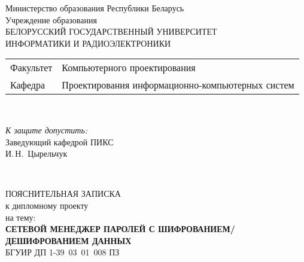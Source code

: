 \begin{titlepage}
  \begin{center}
    Министерство образования Республики Беларусь\\[1em]
    Учреждение образования\\
    БЕЛОРУССКИЙ ГОСУДАРСТВЕННЫЙ УНИВЕРСИТЕТ \\
    ИНФОРМАТИКИ И РАДИОЭЛЕКТРОНИКИ\\[1em]

    \begin{minipage}{\textwidth}
      \begin{flushleft}
        \begin{tabular}{ l l }
          Факультет & Компьютерного проектирования\\
          Кафедра   & Проектирования информационно-компьютерных систем
        \end{tabular}
      \end{flushleft}
    \end{minipage}\\[1em]

    \begin{flushright}
      \begin{minipage}{0.4\textwidth}
        \textit{К защите допустить:}\\[0.8em]
        Заведующий кафедрой ПИКС\\[0.45em]
        \underline{\hspace*{2.8cm}} И.\,Н.~Цырельчук
      \end{minipage}\\[2.2em]
    \end{flushright}

    {ПОЯСНИТЕЛЬНАЯ ЗАПИСКА}\\
    {к дипломному проекту}\\
    {на тему:}\\[1em]
    \textbf{\large СЕТЕВОЙ МЕНЕДЖЕР ПАРОЛЕЙ С ШИФРОВАНИЕМ/ДЕШИФРОВАНИЕМ ДАННЫХ}\\[1em]


    {БГУИР ДП 1-39 03 01 008 ПЗ}\\[2em]


\end{center}
\end{titlepage}
